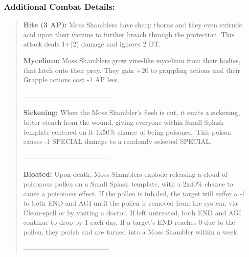 \documentclass[11pt,a4paper,twocolumn]{book}
\begin{document}
	\subsubsection*{Additional Combat Details:}
	\begin{verse}
		\textbf{Bite (3 AP):} Moss Shamblers have sharp thorns and they even extrude acid upon their victims to further breach through the protection. This attack deals 1+(2) damage and ignores 2 DT.
		
		\textbf{Mycelium:} Moss Shamblers grow vine-like mycelium from their bodies, that latch onto their prey. They gain +20 to grappling actions and their Grapple actions cost -1 AP less.
		
	--------------------------------------
	
		\textbf{Sickening:} When the Moss Shambler's flesh is cut, it emits a sickening, bitter stench from the wound, giving everyone within Small Splash template centered on it 1x50\% chance of being poisoned. This poison causes -1 SPECIAL damage to a randomly selected SPECIAL.
		
	--------------------------------------	
		
		\textbf{Bloated:} Upon death, Moss Shamblers explode releasing a cloud of poisonous pollen on a Small Splash template, with a 2x40\%  chance to cause a poisonous effect. If the pollen is inhaled, the target will suffer a -1 to both END and AGI until the pollen is removed from the system, via Clean-spell or by visiting a doctor. If left untreated, both END and AGI continue to drop by 1 each day. If a target's END reaches 0 due to the pollen, they perish and are turned into a Moss Shambler within a week.
		
	--------------------------------------
		
%		
%		
%		
	\end{verse}
	
\end{document}
